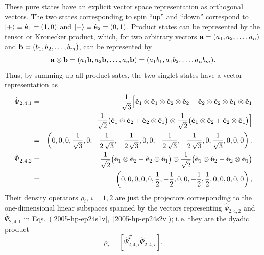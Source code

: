 \documentclass[rmp,amsfonts,showpacs,showkeys,preprint]{revtex4}
\begin{document}
These pure states have an explicit vector space representation as orthogonal vectors.
The two states corresponding to spin ``up'' and ``down'' correspond to
$
\vert +\rangle
\equiv {\hat {\bf e}}_1 =(1,0)
$
and
$
\vert -\rangle \equiv {\hat {\bf e}}_2 =(0,1)
$.
Product states can be represented by the tensor or Kronecker product,
which, for two arbitrary vectors ${\bf a}=(a_1,a_2,\ldots ,a_n)$ and ${\bf b} =(b_1,b_2,\ldots ,b_m)$, can be represented by
\begin{equation}
{\bf a} \otimes {\bf b} = (a_1{\bf b},a_2{\bf b},\ldots ,a_n{\bf b}) = (a_1b_1,a_1b_2,\ldots ,a_nb_m).
\end{equation}
Thus, by summing up all product sates, the two singlet states have a vector representation as
\begin{eqnarray} \hat  \Psi_{2,4,1}
&=&
{1\over \sqrt{3}}\Bigl[
{\hat {\bf e}}_1\otimes {\hat {\bf e}}_1\otimes {\hat {\bf e}}_2\otimes {\hat {\bf e}}_2+
{\hat {\bf e}}_2\otimes {\hat {\bf e}}_2\otimes {\hat {\bf e}}_1\otimes {\hat {\bf e}}_1
 \nonumber \\
&&\qquad
-  {1\over \sqrt{2}}\bigl({\hat {\bf e}}_1\otimes {\hat {\bf e}}_2+{\hat {\bf e}}_2\otimes {\hat {\bf e}}_1 \bigr)
\otimes
 {1\over \sqrt{2}}\bigl({\hat {\bf e}}_1\otimes {\hat {\bf e}}_2+{\hat {\bf e}}_2\otimes {\hat {\bf e}}_1 \bigr)
\Bigr]\nonumber \\
&=&\left( 0,0,0,\frac{1}{{\sqrt{3}}},0,
  -\frac{1}{2\,{\sqrt{3}}},-\frac{1}{2\,{\sqrt{3}}},0,
  0,-\frac{1}{2\,{\sqrt{3}}},-\frac{1}{2\,{\sqrt{3}}},
  0,\frac{1}{{\sqrt{3}}},0,0,0\right).
\label{2005-hp-ep24s2v}
\\
\hat  \Psi_{2,4,2}
 &=&
{1\over \sqrt{2}}\bigl({\hat {\bf e}}_1\otimes {\hat {\bf e}}_2-{\hat {\bf e}}_2\otimes {\hat {\bf e}}_1 \bigr)
\otimes
 {1\over \sqrt{2}}\bigl({\hat {\bf e}}_1\otimes {\hat {\bf e}}_2-{\hat {\bf e}}_2\otimes {\hat {\bf e}}_1 \bigr)
\nonumber \\
&=&\left( 0,0,0,0,0,\frac{1}{2},- \frac{1}{2} ,  0,0,- \frac{1}{2} ,\frac{1}{2},0,0,0,0,  0\right),
\label{2005-hp-ep24s1v}
\end{eqnarray}
Their density operators $\rho_{i}$, $i=1,2$
are just the projectors corresponding to the one-dimensional
linear subspaces spanned by
the vectors representing
$ \hat \Psi_{2,4,2}$
and
$\hat \Psi_{2,4,1}$
in Eqs.~(\ref{2005-hp-ep24s1v},~\ref{2005-hp-ep24s2v}); i.\,e.
they are  the dyadic product
\begin{equation}
\rho_{i} = \left[ {\hat \Psi}_{2,4,i}^T {\hat \Psi}_{2,4,i}\right].
\end{equation}
\end{document}
